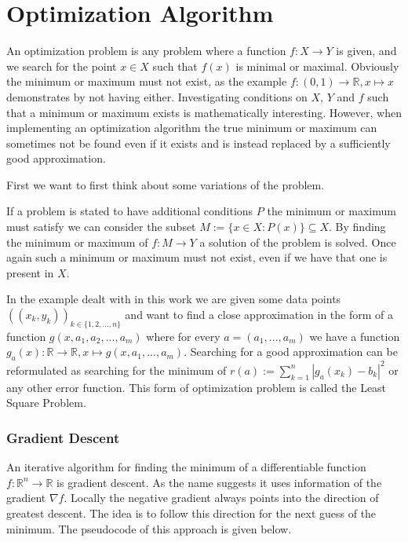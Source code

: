 \chapter{Optimization Algorithm}
\label{chapter:optimization}

An optimization problem is any problem where a function $f:X \rightarrow Y$ is given, and we search for the point $x \in X$ such that $f(x)$ is minimal or maximal. Obviously the minimum or maximum must not exist, as the example $f: (0, 1) \rightarrow \mathbb{R}, x \mapsto x$ demonstrates by not having either. Investigating conditions on $X$, $Y$ and $f$ such that a minimum or maximum exists is mathematically interesting. However, when implementing an optimization algorithm the true minimum or maximum can sometimes not be found even if it exists and is instead replaced by a sufficiently good approximation.

First we want to first think about some variations of the problem.

If a problem is stated to have additional conditions $P$ the minimum or maximum must satisfy we can consider the subset $M:= \{x \in X: P(x)\} \subseteq X$. By finding the minimum or maximum of $f: M \rightarrow Y$ a solution of the problem is solved. Once again such a minimum or maximum must not exist, even if we have that one is present in $X$.


In the example dealt with in this work we are given some data points $((x_k, y_k))_{k \in \{1, 2, ..., n\}}$ and want to find a close approximation in the form of a function $g(x, a_1, a_2, ..., a_m)$ where for every $a = (a_1, ..., a_m)$ we have a function $g_a(x) : \mathbb{R} \rightarrow \mathbb{R}, x \mapsto g(x, a_1, ..., a_m)$. Searching for a good approximation can be reformulated as searching for the minimum of $r(a) := \sum_{k=1}^{n} |g_a(x_k) - b_k|^2$ or any other error function. This form of optimization problem is called the Least Square Problem.

\subsection{Gradient Descent}

An iterative algorithm for finding the minimum of a differentiable function $f: \mathbb{R}^n \rightarrow \mathbb{R}$ is gradient descent. As the name suggests it uses information of the gradient $\nabla f$. Locally the negative gradient always points into the direction of greatest descent. The idea is to follow this direction for the next guess of the minimum. The pseudocode of this approach is given below.

